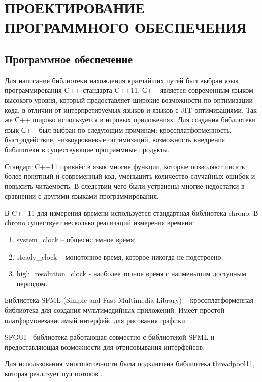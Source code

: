 \section[Проектирование программного обеспечения]{\MakeTextUppercase{ПРОЕКТИРОВАНИЕ ПРОГРАММНОГО ОБЕСПЕЧЕНИЯ}}
\subsection{Программное обеспечение}

Для написание библиотеки нахождения кратчайших путей был выбран язык программирования C++ стандарта C++11. С++ является современным языком высокого уровня, который предоставляет широкие возможности по оптимизации кода, в отличии от интерпретируемых языков и языков с JIT оптимизациями. Так же С++ широко используется в игровых приложениях. Для создания библиотеки язык С++ был выбран по следующим причинам: кроссплатформенность, быстродействие, низкоуровневые оптимизаций, возможность внедрения библиотеки в существующие программные продукты. 

Стандарт C++11 привнёс в язык многие функции, которые позволяют писать более понятный и современный код, уменьшить количество случайных ошибок и повысить читаемость. В следствии чего были устранены многие недостатки в сравнении с другими языками программирования.

В C++11 для измерения времени используется стандартная библиотека chrono. В chrono существует несколько реализаций измерения времени:

\begin{enumerate}
    \item system\_clock -- общесистемное время;
    \item steady\_clock -- монотонное время, которое никогда не подстроено;
    \item high\_resolution\_clock - наиболее точное время с наименьшим доступным периодом.  
\end{enumerate} 

Библиотека SFML (Simple and Fast Multimedia Library) -- кроссплатформенная библиотека для создания мультимедийных приложений. Имеет простой платформонезависимый интерфейс для рисования графики.

SFGUI - библиотека работающая совместно с библиотекой SFML и предоставляющая возможности для отрисовывания интерфейсов.

Для использования многопоточности была подключена библиотека threadpool11, которая реализует пул потоков \cite{THREAD_POOL}.

